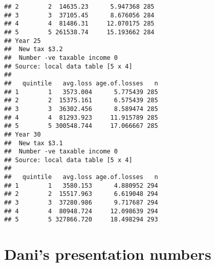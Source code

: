 \documentclass{grattan}\usepackage[]{graphicx}\usepackage[]{color}
\makeatletter
\newenvironment{kframe}{%
 \def\at@end@of@kframe{}%
 \ifinner\ifhmode%
  \def\at@end@of@kframe{\end{minipage}}%
  \begin{minipage}{\columnwidth}%
 \fi\fi%
 \def\FrameCommand##1{\hskip\@totalleftmargin \hskip-\fboxsep
 \colorbox{shadecolor}{##1}\hskip-\fboxsep
     \hskip-\linewidth \hskip-\@totalleftmargin \hskip\columnwidth}%
 \MakeFramed {\advance\hsize-\width
   \@totalleftmargin\z@ \linewidth\hsize
   \@setminipage}}%
 {\par\unskip\endMakeFramed%
 \at@end@of@kframe}
\newenvironment{knitrout}{}{} %
\makeatother
\begin{document}
\begin{knitrout}
\begin{kframe}
\begin{verbatim}
## 2        2  14635.23      5.947368 285
## 3        3  37105.45      8.676056 284
## 4        4  81486.31     12.070175 285
## 5        5 261538.74     15.193662 284
## Year 25 
##  New tax $3.2 
##  Number -ve taxable income 0 
## Source: local data table [5 x 4]
## 
##   quintile   avg.loss age.of.losses   n
## 1        1   3573.004      5.775439 285
## 2        2  15375.161      6.575439 285
## 3        3  36302.456      8.589474 285
## 4        4  81293.923     11.915789 285
## 5        5 300548.744     17.066667 285
## Year 30 
##  New tax $3.1 
##  Number -ve taxable income 0 
## Source: local data table [5 x 4]
## 
##   quintile   avg.loss age.of.losses   n
## 1        1   3580.153      4.880952 294
## 2        2  15517.963      6.619048 294
## 3        3  37280.986      9.717687 294
## 4        4  80948.724     12.098639 294
## 5        5 327866.720     18.498294 293
\end{verbatim}
\end{kframe}
\end{knitrout}


\chapter{Dani's presentation numbers}
\onecolumn
\end{document}
